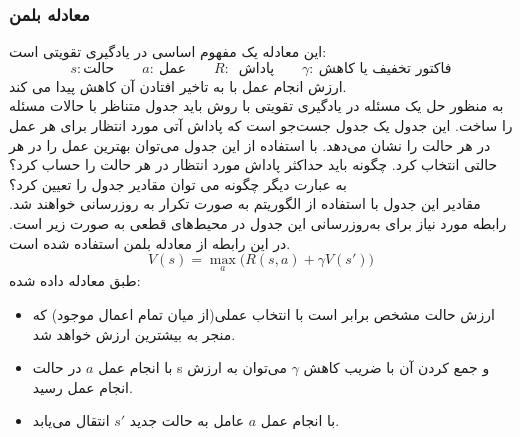  \subsubsection{ معادله بلمن}
 این معادله یک مفهوم اساسی در یادگیری تقویتی است:
 $$ s: \text{حالت}\qquad a:\ \text{عمل}\qquad R:\ \text{ پاداش}\qquad  \gamma:\ \text{فاکتور تخفیف یا کاهش}$$
ارزش انجام عمل با به تاخیر افتادن آن کاهش پیدا می کند.
 \\
 به منظور حل یک مسئله در یادگیری تقویتی با روش  باید جدول  متناظر با حالات مسئله را  ساخت. این جدول یک جدول جست‌جو است که پاداش آتی مورد انتظار برای هر عمل در هر حالت را نشان می‌دهد. با استفاده از این جدول می‌توان بهترین عمل را در هر حالتی انتخاب کرد.
 چگونه باید حداکثر پاداش مورد انتظار در هر حالت را حساب کرد؟ به عبارت دیگر چگونه می توان مقادیر جدول  را تعیین کرد؟
 \\
  مقادیر این جدول با استفاده از الگوریتم  به صورت تکرار به روزرسانی خواهند شد. رابطه مورد نیاز برای به‌روزرسانی این جدول در محیط‌های قطعی به صورت زیر است. در این رابطه از معادله بلمن استفاده شده است.
 \begin{equation}
 	V(s) = \max_{a}\big(R(s,a)+\gamma V(s')\big)
 \end{equation}
 طبق معادله داده شده:
 \begin{itemize}
 	\item  ارزش حالت مشخص برابر است با انتخاب عملی(از میان تمام  اعمال موجود) که منجر به بیشترین ارزش خواهد شد. 
 	\item  با انجام عمل $a$ در حالت s و جمع کردن آن با ضریب کاهش $\gamma$ می‌توان به ارزش انجام عمل رسید. 
 	\item  با انجام عمل $a$ عامل به حالت جدید $s'$ انتقال می‌یابد.
 \end{itemize}

